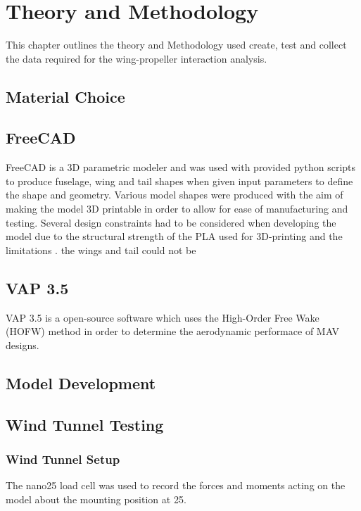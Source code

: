 \graphicspath{{./Figs/}}

\chapter{Theory and Methodology}
This chapter outlines the theory and Methodology used create, test and collect the data required for the wing-propeller interaction analysis. 

\section{Material Choice}

\section{FreeCAD}
FreeCAD is a 3D parametric modeler and was used with provided python scripts to produce fuselage, wing and tail shapes when given input parameters to define the shape and geometry. Various model shapes were produced with the aim of making the model 3D printable in order to allow for ease of manufacturing and testing. Several design constraints had to be considered when developing the model due to the structural strength of the PLA used for 3D-printing and the limitations . the wings and tail could not be 

\section{VAP 3.5}
VAP 3.5 is a open-source software which uses the High-Order Free Wake (HOFW)  method in order to determine the aerodynamic performace of MAV designs. 


\section{Model Development}

\section{Wind Tunnel Testing}

\subsection{Wind Tunnel Setup}

The nano25 load cell was used to record the forces and moments acting on the model about the mounting position at 25. 

